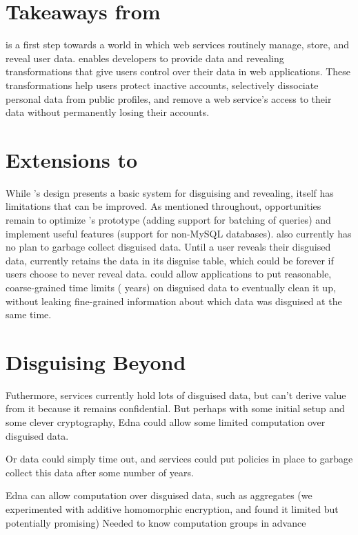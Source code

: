 \section{Takeaways from \sys}
%
\sys is a first step towards a world in which web services
routinely manage, store, and reveal \xxed user data.
%
\sys enables developers to provide data \xxing and revealing
transformations that give users control over their data in web applications.
%
These transformations help users protect inactive accounts, selectively dissociate
personal data from public profiles, and remove a web service's access to their
data without permanently losing their accounts.
%

\section{Extensions to \sys}
While \sys's design presents a basic system for disguising and revealing, \sys
itself has limitations that can be improved. 
%
As mentioned throughout, opportunities remain to optimize \sys's prototype
(\eg adding support for batching of queries) and implement useful features 
(\eg support for non-MySQL databases). 
%
\sys also currently has no plan to garbage collect disguised data.
Until a user reveals their disguised data, \sys currently retains the data in
its disguise table, which could be forever if users choose to never reveal data.
%
\sys could allow applications to put reasonable, coarse-grained time limits ( years) on disguised data to eventually clean it up, without leaking
fine-grained information about which data was disguised at the same time.

\section{Disguising Beyond \sys}

Futhermore, services currently hold lots of disguised data, but can’t derive value from it because it remains confidential. But perhaps with some initial setup and some clever cryptography, Edna could allow some limited computation over disguised data.

Or data could simply time out, and services could put policies in place to garbage collect this data after some number of years.


Edna can allow computation over disguised data, such as aggregates (we experimented with additive homomorphic encryption, and found it limited but potentially promising)
Needed to know computation groups in advance

